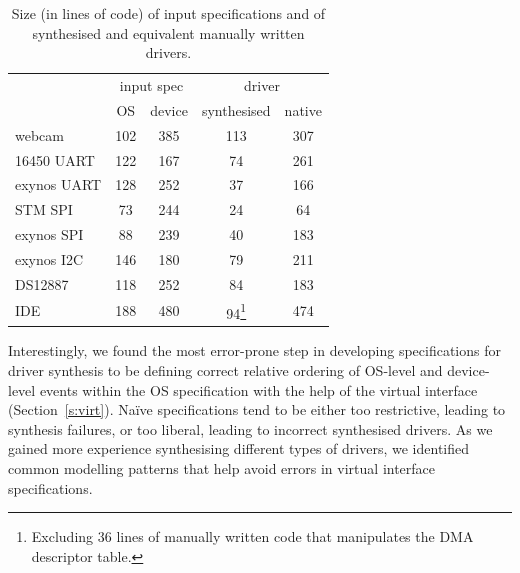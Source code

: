 \begin{table}
    \begin{minipage}{\linewidth}
    \center
    \begin{tabular}{|l|c|c|c|c|}
        \hline
        & \multicolumn{2}{|c|}{input spec} & \multicolumn{2}{c|}{driver} \\
        \cline{2-5}
                     & OS  & device & synthesised & native \\
        \hline
        \hline
        webcam       & 102 & 385    & 113         & 307 \\
        16450 UART   & 122 & 167    & 74          & 261 \\
        exynos UART  & 128 & 252    & 37          & 166 \\
        STM SPI      & 73  & 244    & 24          & 64  \\
        exynos SPI   & 88  & 239    & 40          & 183 \\
        exynos I2C   & 146 & 180    & 79          & 211 \\
        DS12887      & 118 & 252    & 84          & 183 \\
        IDE          & 188 & 480    & 94\footnote{Excluding 36 lines of manually written code that manipulates the DMA descriptor table.} & 474 \\
        \hline
    \end{tabular}
    \end{minipage}
    \caption{Size (in lines of code) of input specifications and of synthesised and equivalent manually written drivers.}
    \label{t:size}
\end{table}

Interestingly, we found the most error-prone step in developing specifications for driver synthesis to be defining correct relative ordering of OS-level and device-level events within the OS specification with the help of the virtual interface (Section~\ref{s:virt}).  Na\"ive specifications tend to be either too restrictive, leading to synthesis failures, or too liberal, leading to incorrect synthesised drivers. As we gained more experience synthesising different types of drivers, we identified common modelling patterns that help avoid errors in virtual interface specifications.  


